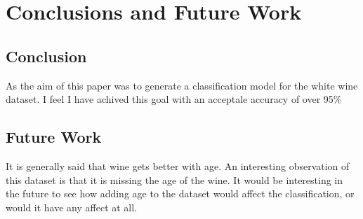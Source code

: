 \section{Conclusions and Future Work}

\subsection{Conclusion}

As the aim of this paper was to generate a classification model for the white wine dataset. I feel I have achived this goal with an acceptale accuracy of over 95\%

\subsection{Future Work}

It is generally said that wine gets better with age. An interesting observation of this dataset is that it is missing the age of the wine. It would be interesting in the future to see how adding age to the dataset would affect the classification, or would it have any affect at all.



